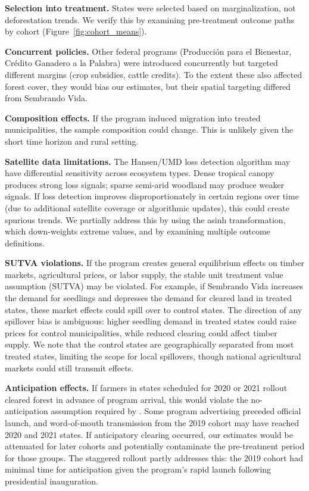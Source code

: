 \documentclass[12pt]{article}
\begin{document}
\textbf{Selection into treatment.} States were selected based on marginalization, not deforestation trends. We verify this by examining pre-treatment outcome paths by cohort (Figure~\ref{fig:cohort_means}).

\textbf{Concurrent policies.} Other federal programs (Producci\'{o}n para el Bienestar, Cr\'{e}dito Ganadero a la Palabra) were introduced concurrently but targeted different margins (crop subsidies, cattle credits). To the extent these also affected forest cover, they would bias our estimates, but their spatial targeting differed from Sembrando Vida.

\textbf{Composition effects.} If the program induced migration into treated municipalities, the sample composition could change. This is unlikely given the short time horizon and rural setting.

\textbf{Satellite data limitations.} The Hansen/UMD loss detection algorithm may have differential sensitivity across ecosystem types. Dense tropical canopy produces strong loss signals; sparse semi-arid woodland may produce weaker signals. If loss detection improves disproportionately in certain regions over time (due to additional satellite coverage or algorithmic updates), this could create spurious trends. We partially address this by using the asinh transformation, which down-weights extreme values, and by examining multiple outcome definitions.

\textbf{SUTVA violations.} If the program creates general equilibrium effects on timber markets, agricultural prices, or labor supply, the stable unit treatment value assumption (SUTVA) may be violated. For example, if Sembrando Vida increases the demand for seedlings and depresses the demand for cleared land in treated states, these market effects could spill over to control states. The direction of any spillover bias is ambiguous: higher seedling demand in treated states could raise prices for control municipalities, while reduced clearing could affect timber supply. We note that the control states are geographically separated from most treated states, limiting the scope for local spillovers, though national agricultural markets could still transmit effects.

\textbf{Anticipation effects.} If farmers in states scheduled for 2020 or 2021 rollout cleared forest in advance of program arrival, this would violate the no-anticipation assumption required by \citet{callaway2021difference}. Some program advertising preceded official launch, and word-of-mouth transmission from the 2019 cohort may have reached 2020 and 2021 states. If anticipatory clearing occurred, our estimates would be attenuated for later cohorts and potentially contaminate the pre-treatment period for those groups. The staggered rollout partly addresses this: the 2019 cohort had minimal time for anticipation given the program's rapid launch following presidential inauguration.
\end{document}
